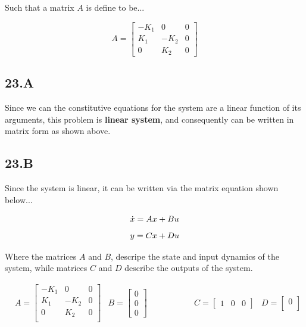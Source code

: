 \documentclass[12px]{article}
\begin{document}
Such that a matrix $A$ is define to be...

$$
A =
\begin{bmatrix}
    -K_{1} & 0 & 0 \\
    K_{1} & -K_{2} & 0 \\
    0 & K_{2} & 0
\end{bmatrix}
$$

\subsection*{23.A}
Since we can the constitutive equations for the system are a linear function of its arguments, this problem is \textbf{linear system}, and consequently can be written in matrix form as shown above.

\subsection*{23.B}

Since the system is linear, it can be written via the matrix equation shown below...


    $$    \dot{x} = Ax + Bu \\$$
    $$    y = Cx + Du \\$$

\noindent Where the matrices $A$ and $B$, descripe the state and input dynamics of the system, while matrices $C$ and $D$ describe the outputs of the system.

\begin{equation*}
    \begin{aligned}
        & A =
        \begin{bmatrix}
            -K_{1} & 0 & 0 \\
            K_{1} & -K_{2} & 0 \\
            0 & K_{2} & 0 \\
        \end{bmatrix}
        & B =
        \begin{bmatrix}
            0 \\
            0 \\
            0
        \end{bmatrix}
    \end{aligned}
    \qquad \qquad
    \begin{aligned}
        & C =
        \begin{bmatrix}
            1 & 0 & 0
        \end{bmatrix}
        & D =
        \begin{bmatrix}
            0 \\
        \end{bmatrix}
    \end{aligned}
\end{equation*}
\end{document}
